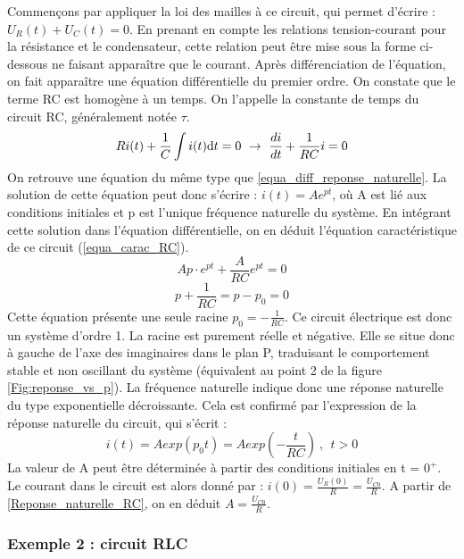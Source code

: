 	\vspace{1\baselineskip}
	Commençons par appliquer la loi des mailles à ce circuit, qui permet d'écrire : $U_{R}(t)+U_{C}(t)=0.$ En prenant en compte les relations tension-courant pour la résistance et le condensateur, cette relation peut être mise sous la forme ci-dessous ne faisant apparaître que le courant. Après différenciation de l'équation, on fait apparaître une équation différentielle du premier ordre. On constate que le terme RC est homogène à un temps. On l'appelle la constante de temps du circuit RC, généralement notée $\tau$.
	\begin{equation*}
	Ri(t)+\frac{1}{C}\int i(t) \mathrm{d{}} t=0~\rightarrow ~\frac{di}{dt}+\frac{1}{RC}i = 0
	\end{equation*}
	On retrouve une équation du même type que \ref{equa_diff_reponse_naturelle}. La solution de cette équation peut donc s'écrire : $i(t) = Ae^{pt}$, où A est lié aux conditions initiales et p est l'unique fréquence naturelle du système. En intégrant cette solution dans l'équation différentielle, on en déduit l'équation caractéristique de ce circuit (\ref{equa_carac_RC}).
	\begin{equation*}
	Ap\cdot e^{pt}+\frac{A}{RC} e^{pt}=0
	\end{equation*}
	\begin{equation}\label{equa_carac_RC}
	p+\frac{1}{RC}=p-p_{0}=0
	\end{equation}
	Cette équation présente une seule racine $p_{0} = -\frac{1}{RC}$. Ce circuit électrique est donc un système d'ordre 1. La racine est purement réelle et négative. Elle se situe donc à gauche de l'axe des imaginaires dans le plan P, traduisant le comportement stable et non oscillant du système (équivalent au point 2 de la figure \ref{Fig:reponse_vs_p}). La fréquence naturelle	indique donc une réponse naturelle du type exponentielle décroissante. Cela est confirmé par l'expression de la réponse naturelle du circuit, qui s'écrit :
	\begin{equation}\label{Reponse_naturelle_RC}
	i(t)=Aexp(p_{0}t)=Aexp(-\frac{t}{RC})~,~~t>0
	\end{equation}
	La valeur de A peut être déterminée à partir des conditions initiales en t = $0^{+}$. Le courant dans le circuit est alors donné par : $i(0)=\frac{U_{R}(0)}{R}=\frac{U_{C0}}{R}$. A partir de \ref{Reponse_naturelle_RC}, on en déduit $A=\frac{U_{C0}}{R}$.


	\subsubsection{Exemple 2 : circuit RLC}
	
